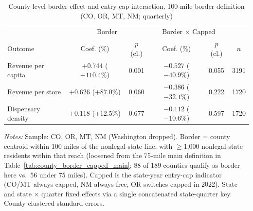 \begin{table}[htbp]
\centering
\caption{County-level border effect and entry-cap interaction, 100-mile border definition (CO, OR, MT, NM; quarterly)}
\label{tab:county_border_capped_main_100mi}
\footnotesize
\begin{tabular}{lccccc}
\toprule
& \multicolumn{2}{c}{Border} & \multicolumn{2}{c}{Border $\times$ Capped} & \\
Outcome & Coef. (\%) & $p$ (cl.) & Coef. (\%) & $p$ (cl.) & $n$ \\
\midrule
Revenue per capita & $+0.744$ ($+110.4\%$) & 0.001 & $-0.527$ ($-40.9\%$) & 0.055 & 3191 \\
Revenue per store & $+0.626$ ($+87.0\%$) & 0.060 & $-0.386$ ($-32.1\%$) & 0.222 & 1720 \\
Dispensary density & $+0.118$ ($+12.5\%$) & 0.677 & $-0.112$ ($-10.6\%$) & 0.597 & 1720 \\
\bottomrule
\end{tabular}
\begin{minipage}{0.98\textwidth}
\vspace{0.3em}
\footnotesize
\textit{Notes:} Sample: CO, OR, MT, NM (Washington dropped). Border = county centroid within 100 miles of the
nonlegal-state line, with $\geq$1,000 nonlegal-state residents within that reach (loosened from the 75-mile main
definition in Table~\ref{tab:county_border_capped_main}; 88 of 189 counties qualify as border here vs.\ 56 under
75 miles). Capped is the state-year entry-cap indicator (CO/MT always capped, NM always free, OR switches capped
in 2022). State and state $\times$ quarter fixed effects via a single concatenated state-quarter key. County-clustered
standard errors.
\end{minipage}
\end{table}
